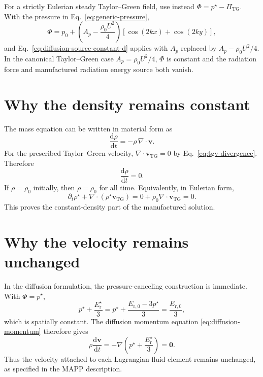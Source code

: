 \documentclass[11pt]{article}
\newcommand{\dd}{\mathrm{d}}
\newcommand{\Div}{\nabla\!\cdot}
\newcommand{\Grad}{\nabla}
\newcommand{\Er}{E_{\mathrm r}}
\newcommand{\Erzero}{E_{\mathrm r,0}}
\begin{document}
For a strictly Eulerian steady Taylor--Green field, use instead
\(\Phi=p^\star-\Pi_{\mathrm{TG}}\).  With the pressure in
Eq.~\eqref{eq:generic-pressure},
\begin{equation}
  \Phi
  =
  p_0 +
  \left(A_p-\frac{\rho_0U^2}{4}\right)
  \left[\cos(2kx)+\cos(2ky)\right],
  \label{eq:eulerian-potential-explicit}
\end{equation}
and Eq.~\eqref{eq:diffusion-source-constant-d} applies with \(A_p\) replaced by
\(A_p-\rho_0U^2/4\).  In the canonical Taylor--Green case
\(A_p=\rho_0U^2/4\), \(\Phi\) is constant and the radiation force and
manufactured radiation energy source both vanish.

\section{Why the density remains constant}

The mass equation can be written in material form as
\begin{equation}
  \frac{\dd\rho}{\dd t} = -\rho\,\Div\bm{v}.
  \label{eq:material-mass}
\end{equation}
For the prescribed Taylor--Green velocity,
\(\Div\bm{v}_{\mathrm{TG}}=0\) by Eq.~\eqref{eq:tgv-divergence}.  Therefore
\begin{equation}
  \frac{\dd\rho}{\dd t}=0.
  \label{eq:density-material-constant}
\end{equation}
If \(\rho=\rho_0\) initially, then \(\rho=\rho_0\) for all time.  Equivalently,
in Eulerian form,
\begin{equation}
  \partial_t\rho^\star + \Div(\rho^\star\bm{v}_{\mathrm{TG}})
  =
  0+\rho_0\Div\bm{v}_{\mathrm{TG}}
  =
  0.
  \label{eq:density-eulerian-constant}
\end{equation}
This proves the constant-density part of the manufactured solution.

\section{Why the velocity remains unchanged}

In the diffusion formulation, the pressure-canceling construction is immediate.
With \(\Phi=p^\star\),
\begin{equation}
  p^\star + \frac{\Er^\star}{3}
  =
  p^\star + \frac{\Erzero-3p^\star}{3}
  =
  \frac{\Erzero}{3},
  \label{eq:total-pressure-constant}
\end{equation}
which is spatially constant.  The diffusion momentum equation
\eqref{eq:diffusion-momentum} therefore gives
\begin{equation}
  \rho\frac{\dd\bm{v}}{\dd t}
  =
  -\Grad\left(p^\star+\frac{\Er^\star}{3}\right)
  =
  \bm{0}.
  \label{eq:velocity-diffusion-proof}
\end{equation}
Thus the velocity attached to each Lagrangian fluid element remains unchanged,
as specified in the MAPP description.
\end{document}
